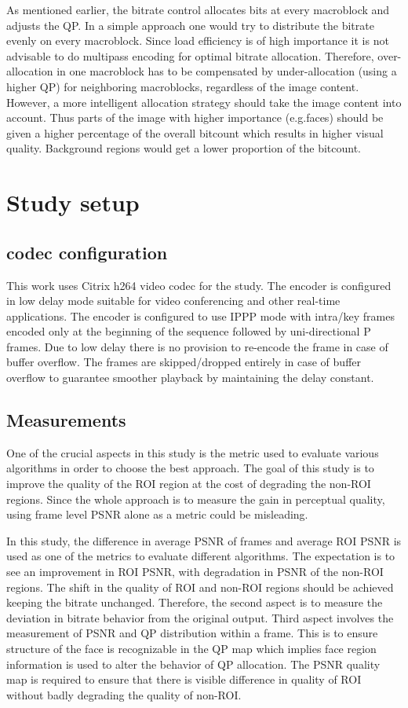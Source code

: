 \documentclass[11pt]{article} %
\begin{document}
 As mentioned earlier, the bitrate control allocates bits at every macroblock and adjusts the QP. In a simple approach one would try to distribute the bitrate evenly on every macroblock. Since load efficiency is of high importance it is not advisable to do multipass encoding for optimal bitrate allocation. Therefore, over-allocation in one macroblock has to be compensated by under-allocation (using a higher QP) for neighboring macroblocks, regardless of the image content. However, a more intelligent allocation strategy should take the image content into account. Thus parts of the image with higher importance (e.g.faces) should be given a higher percentage of the overall bitcount which results in higher visual quality. Background regions would get a lower proportion of the bitcount.

\section{Study setup}
\subsection{codec configuration}      
This work uses Citrix h264 video codec for the study. The encoder is configured in low delay mode suitable for video conferencing and other real-time applications. The encoder is configured to use IPPP mode with intra/key frames encoded only at the beginning of the sequence followed by uni-directional P frames. Due to low delay there is no provision to re-encode the frame in case of buffer overflow. The frames are skipped/dropped entirely in case of buffer overflow to guarantee smoother playback by maintaining the delay constant. 
\subsection{Measurements}
One of the crucial aspects in this study is the metric used to evaluate various algorithms in order to choose the best approach. The goal of this study is to improve the quality of the ROI region at the cost of degrading the non-ROI regions. Since the whole approach is to measure the gain in perceptual quality, using frame level PSNR alone as a metric could be misleading. 

In this study, the difference in average PSNR of frames and average ROI PSNR is used as one of the metrics to evaluate different algorithms. The expectation is to see an improvement in ROI PSNR, with degradation in PSNR of the non-ROI regions. The shift in the quality of ROI and non-ROI regions should be achieved keeping the bitrate unchanged. Therefore, the second aspect is to measure the deviation in bitrate behavior from the original output. Third aspect involves the measurement of PSNR and QP distribution within a frame. This is to ensure structure of the face is recognizable in the QP map which implies face region information is used to alter the behavior of QP allocation. The PSNR quality map is required to ensure that there is visible difference in quality of ROI without badly degrading the quality of non-ROI. 
\end{document}

